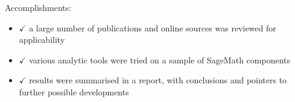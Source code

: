Accomplishments:

\begin{itemize}
\tightlist
\item
  \(\checkmark\) a large number of publications and online sources was
  reviewed for applicability
\item
  \(\checkmark\) various analytic tools were tried on a sample of
  SageMath components
\item
  \(\checkmark\) results were summarised in a report, with conclusions
  and pointers to further possible developments
\end{itemize}
